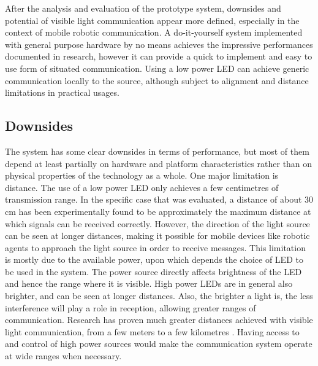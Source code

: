 After the analysis and evaluation of the prototype system, downsides and potential of visible light communication appear more defined, especially in the context of mobile robotic communication.
A do-it-yourself system implemented with general purpose hardware by no means achieves the impressive performances documented in research, however it can provide a quick to implement and easy to use form of situated communication.
Using a low power LED can achieve generic communication locally to the source, although subject to alignment and distance limitations in practical usages.

\subsection{Downsides}
The system has some clear downsides in terms of performance, but most of them depend at least partially on hardware and platform characteristics rather than on physical properties of the technology as a whole.
One major limitation is distance. The use of a low power LED only achieves a few centimetres of transmission range.
In the specific case that was evaluated, a distance of about 30 cm has been experimentally found to be approximately the maximum distance at which signals can be received correctly.
However, the direction of the light source can be seen at longer distances, making it possible for mobile devices like robotic agents to approach the light source in order to receive messages.
This limitation is mostly due to the available power, upon which depends the choice of LED to be used in the system.
The power source directly affects brightness of the LED and hence the range where it is visible.
High power LEDs are in general also brighter, and can be seen at longer distances.
Also, the brighter a light is, the less interference will play a role in reception, allowing greater ranges of communication.
Research has proven much greater distances achieved with visible light communication, from a few meters to a few kilometres \cite{ronja}.
Having access to and control of high power sources would make the communication system operate at wide ranges when necessary.

